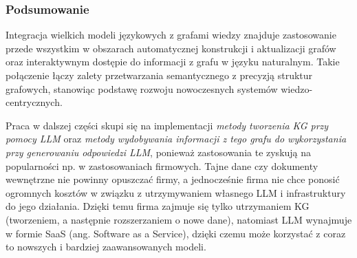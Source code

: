 \documentclass[
a4paper,
12pt,
]{article}
\begin{document}



\subsubsection{Podsumowanie}
Integracja wielkich modeli językowych z grafami wiedzy znajduje zastosowanie przede wszystkim w obszarach automatycznej konstrukcji i aktualizacji grafów oraz interaktywnym dostępie do informacji z grafu w języku naturalnym. Takie połączenie łączy zalety przetwarzania semantycznego z precyzją struktur grafowych, stanowiąc podstawę rozwoju nowoczesnych systemów wiedzo-centrycznych.

Praca w dalszej części skupi się na implementacji \textit{metody tworzenia KG przy pomocy LLM} oraz \textit{metody wydobywania informacji z tego grafu do wykorzystania przy generowaniu odpowiedzi LLM}, ponieważ zastosowania te zyskują na popularności np. w zastosowaniach firmowych. 
Tajne dane czy dokumenty wewnętrzne nie powinny opuszczać firmy, a jednocześnie firma nie chce ponosić ogromnych kosztów w związku z utrzymywaniem własnego LLM i infrastruktury do jego działania. 
Dzięki temu firma zajmuje się tylko utrzymaniem KG (tworzeniem, a następnie rozszerzaniem o nowe dane), natomiast LLM wynajmuje w formie SaaS (ang. Software as a Service), dzięki czemu może korzystać z coraz to nowszych i bardziej zaawansowanych modeli.
\end{document}
